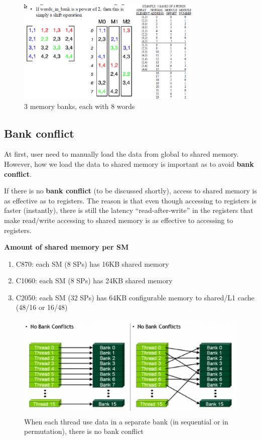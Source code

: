 \begin{enumerate}
  \begin{figure}[hbt]
    \centerline{\includegraphics[height=5cm,
      angle=0]{./images/conflict_reduce_3.eps}}
    \caption{3 memory banks, each with 8 words}
    \label{fig:conflict_reduce_3}
  \end{figure}


\end{enumerate}

\subsection{Bank conflict}
\label{sec:bank-conflict}

At first, user need to manually load the data from global to shared
memory. However, how we load the data to shared memory is important as
to avoid {\bf bank conflict}.

If there is no {\bf bank conflict} (to be discussed shortly), access
to shared memory is as effective as to registers. The reason is that
even though accessing to registers is faster (instantly), there is
still the latency ``read-after-write'' in the registers that make
read/write accessing to shared memory is as effective to accessing to
registers.

\begin{framed}
  {\bf Amount of shared memory per SM}
  \begin{enumerate}
  \item C870: each SM (8 SPs) has 16KB shared memory
  \item C1060: each SM (8 SPs) has 24KB shared memory
  \item C2050: each SM (32 SPs) has 64KB configurable memory to
    shared/L1 cache (48/16 or 16/48)
  \end{enumerate}
\end{framed}




\begin{figure}[hbt]
  \centerline{\includegraphics[height=5cm,
    angle=0]{./images/no_bank_conflict.eps}}
  \caption{When each thread use data in a separate bank (in sequential or in
    permutation), there is no bank conflict}
  \label{fig:no_bank_conflict}
\end{figure}

